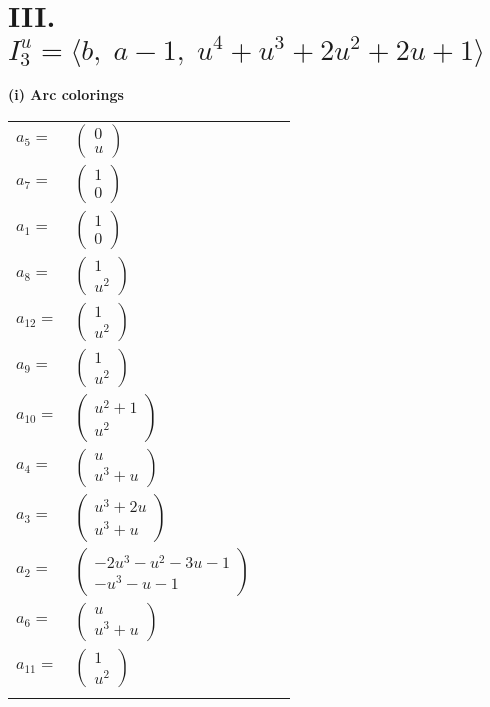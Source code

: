 \documentclass[1p]{elsarticle_modified}
\theoremstyle{definition}
\begin{document}
\centering \section*{III. $I^u_{3}= \langle b,\;a-1,\;u^4+u^3+2 u^2+2 u+1 \rangle$}
\flushleft \textbf{(i) Arc colorings}\\
\begin{tabular}{m{7pt} m{180pt} m{7pt} m{180pt} }
\flushright $a_{5}=$&$\begin{pmatrix}0\\u\end{pmatrix}$ \\
\flushright $a_{7}=$&$\begin{pmatrix}1\\0\end{pmatrix}$ \\
\flushright $a_{1}=$&$\begin{pmatrix}1\\0\end{pmatrix}$ \\
\flushright $a_{8}=$&$\begin{pmatrix}1\\u^2\end{pmatrix}$ \\
\flushright $a_{12}=$&$\begin{pmatrix}1\\u^2\end{pmatrix}$ \\
\flushright $a_{9}=$&$\begin{pmatrix}1\\u^2\end{pmatrix}$ \\
\flushright $a_{10}=$&$\begin{pmatrix}u^2+1\\u^2\end{pmatrix}$ \\
\flushright $a_{4}=$&$\begin{pmatrix}u\\u^3+u\end{pmatrix}$ \\
\flushright $a_{3}=$&$\begin{pmatrix}u^3+2 u\\u^3+u\end{pmatrix}$ \\
\flushright $a_{2}=$&$\begin{pmatrix}-2 u^3- u^2-3 u-1\\- u^3- u-1\end{pmatrix}$ \\
\flushright $a_{6}=$&$\begin{pmatrix}u\\u^3+u\end{pmatrix}$ \\
\flushright $a_{11}=$&$\begin{pmatrix}1\\u^2\end{pmatrix}$\\&\end{tabular}
\end{document}

